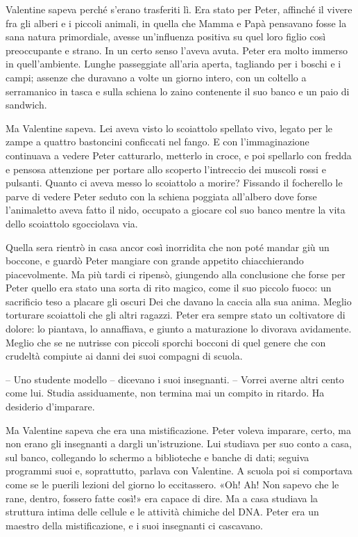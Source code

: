 {Valentine sapeva perché s'erano trasferiti lì. Era stato per Peter,
	affinché il vivere fra gli alberi e i piccoli animali, in quella che
	Mamma e Papà pensavano fosse la sana natura primordiale, avesse
	un'influenza positiva su quel loro figlio così preoccupante e strano. In
	un certo senso l'aveva avuta. Peter era molto immerso in quell'ambiente.
	Lunghe passeggiate all'aria aperta, tagliando per i boschi e i campi;
	assenze che duravano a volte un giorno intero, con un coltello a
	serramanico in tasca e sulla schiena lo zaino contenente il suo banco e
	un paio di sandwich.}

{Ma Valentine sapeva. Lei aveva visto lo scoiattolo spellato vivo,
	legato per le zampe a quattro bastoncini conficcati nel fango. E con
	l'immaginazione continuava a vedere Peter catturarlo, metterlo in croce,
	e poi spellarlo con fredda e pensosa attenzione per portare allo
	scoperto l'intreccio dei muscoli rossi e pulsanti. Quanto ci aveva messo
	lo scoiattolo a morire? Fissando il focherello le parve di vedere Peter
	seduto con la schiena poggiata all'albero dove forse l'animaletto aveva
	fatto il nido, occupato a giocare col suo banco mentre la vita dello
	scoiattolo sgocciolava via.}

{Quella sera rientrò in casa ancor così inorridita che non poté mandar
	giù un boccone, e guardò Peter mangiare con grande appetito
	chiacchierando piacevolmente. Ma più tardi ci ripensò, giungendo alla
	conclusione che forse per Peter quello era stato una sorta di rito
	magico, come il suo piccolo fuoco: un sacrificio teso a placare gli
	oscuri Dei che davano la caccia alla sua anima. Meglio torturare
	scoiattoli che gli altri ragazzi. Peter era sempre stato un coltivatore
	di dolore: lo piantava, lo annaffiava, e giunto a maturazione lo
	divorava avidamente. Meglio che se ne nutrisse con piccoli sporchi
	bocconi di quel genere che con crudeltà compiute ai danni dei suoi
	compagni di scuola.}

{-- Uno studente modello -- dicevano i suoi insegnanti. -- Vorrei averne
	altri cento come lui. Studia assiduamente, non termina mai un compito in
	ritardo. Ha desiderio d'imparare.}

{Ma Valentine sapeva che era una mistificazione. Peter voleva imparare,
	certo, ma non erano gli insegnanti a dargli un'istruzione. Lui studiava
	per suo conto a casa, sul banco, collegando lo schermo a biblioteche e
	banche di dati; seguiva programmi suoi e, soprattutto, parlava con
	Valentine. A scuola poi si comportava come se le puerili lezioni del
	giorno lo eccitassero. «Oh! Ah! Non sapevo che le rane, dentro, fossero
	fatte così!» era capace di dire. Ma a casa studiava la struttura intima
	delle cellule e le attività chimiche del DNA. Peter era un maestro della
	mistificazione, e i suoi insegnanti ci cascavano.}

